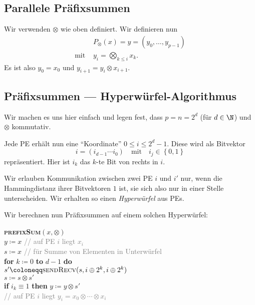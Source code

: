 \subsection{Parallele Präfixsummen}

Wir verwenden \( \otimes \) wie oben definiert. Wir definieren nun
\begin{align*}
  &P_\otimes(x) = y = (y_0,\dots,y_{p-1}) \\
  \text{mit } &y_i = \bigotimes_{k \leq i}x_k\text{.} %
\end{align*}
Es ist also \( y_0 = x_0 \) und \( y_{i+1} = y_i \otimes x_{i+1} \).

\subsection{Präfixsummen --- Hyperwürfel-Algorithmus}

Wir machen es uns hier einfach und legen fest, dass \( p = n = 2^d \) (für \( d \in \N \)) und \( \otimes \) kommutativ.

Jede PE erhält nun eine ``Koordinate'' \( 0 \leq i \leq 2^d-1 \). Diese wird als Bitvektor
\begin{equation*}
  i = (i_{d-1}\cdots i_0) \quad \text{mit} \quad i_j \in \left \{ 0,1 \right \}
\end{equation*}
repräsentiert. Hier ist \( i_k \) das \( k \)-te Bit von rechts in \( i \).

Wir erlauben Kommunikation zwischen zwei PE \( i \) und \( i' \) nur, wenn die Hammingdistanz ihrer Bitvektoren \( 1 \) ist, sie sich also nur in einer Stelle unterscheiden. Wir erhalten so einen \emph{Hyperwürfel} aus PEs.

Wir berechnen nun Präfixsummen auf einem solchen Hyperwürfel:

\begin{pseudocode}
  \textbf{\textsc{prefixSum}}\( (x,\otimes) \) \\
  \( y \coloneqq x \) \enskip \textcolor{gray}{// auf PE \( i \) liegt \( x_i \)} \\
  \( s \coloneqq x \) \enskip \textcolor{gray}{// für Summe von Elementen in Unterwürfel} \\
  \textbf{for} \( k \coloneqq 0 \) \textbf{to} \( d - 1 \) \textbf{do} \\
  \phantom{\enskip} \( s' \coloneqq \textsc{sendRecv}(s,i \oplus 2^k, i \oplus 2^k) \) \\
  \phantom{\enskip} \( s \coloneqq s \otimes s' \) \\
  \phantom{\enskip} \textbf{if} \( i_k \equiv 1 \) \textbf{then} \( y \coloneqq y \otimes s' \) \\
  \textcolor{gray}{// auf PE \( i \) liegt \( y_i = x_0 \otimes \cdots \otimes x_i \)}
\end{pseudocode}

